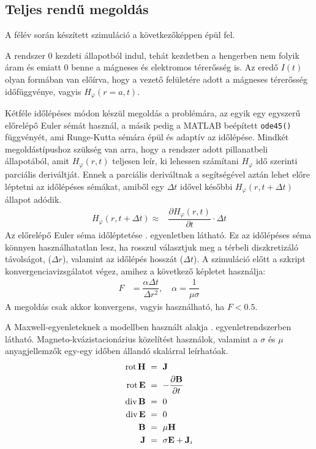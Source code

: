         \subsection{Teljes rendű megoldás}
            A félév során készített szimuláció a következőképpen épül fel.
            \par
            A rendszer 0 kezdeti állapotból indul, tehát kezdetben a hengerben nem folyik áram és emiatt 0 benne a mágneses és elektromos térerősség is. Az eredő $I(t)$ olyan formában van előírva, hogy a vezető felületére adott a mágneses térerősség időfüggvénye, vagyis $H_{\varphi}(r=a,t)$.
            \par
            Kétféle időlépéses módon készül megoldás a problémára, az egyik egy egyszerű előrelépő Euler sémát használ, a másik pedig a MATLAB beépített \verb|ode45()| függvényét, ami Runge-Kutta sémára épül és adaptív az időlépése. Mindkét megoldástípushoz szükség van arra, hogy a rendszer adott pillanatbeli állapotából, amit $H_{\varphi}(r,t)$ teljesen leír, ki lehessen számítani $H_{\varphi}$ idő szerinti parciális deriváltját. Ennek a parciális deriváltnak a segítségével aztán lehet előre léptetni az időlépéses sémákat, amiből egy $\Delta t$ idővel későbbi $H_{\varphi}(r,t+\Delta t)$ állapot adódik.
            \begin{align}
                \label{equ:fe}
                H_{\varphi}(r,t+\Delta t) \approx & \dfrac{\partial H_{\varphi}(r,t)}{\partial t} \cdot \Delta t
            \end{align}
            Az előrelépő Euler séma időléptetése . egyenletben látható. Ez az időlépéses séma könnyen használhatatlan lesz, ha rosszul választjuk meg a térbeli diszkretizáló távolságot, ($\Delta r$), valamint az időlépés hosszát ($\Delta t$). A szimuláció előtt a szkript konvergenciavizsgálatot végez, amihez a következő képletet használja:
            \begin{align}
                F &= \dfrac{\alpha \Delta t}{\Delta r^2}, \quad \alpha = \dfrac{1}{\mu \sigma}
            \end{align}
            A megoldás csak akkor konvergens, vagyis használható, ha $F<0.5$.
            \par
            A Maxwell-egyenleteknek a modellben használt alakja . egyenletrendszerben látható. Magneto-kvázistacionárius közelítést használok, valamint a $\sigma$ és $\mu$ anyagjellemzők egy-egy időben állandó skalárral leírhatóak.
            \begin{equation}\label{equ:maxwell}
                \begin{aligned}
                \operatorname{rot} \textbf{H}~&=~{\bf J} \\
                \operatorname{rot} \textbf{E}~&=~-\dfrac{\partial \textbf{B}}{\partial t} \\
                \operatorname{div} \textbf{B}~&=~0 \\
                \operatorname{div} \textbf{E}~&=~0 \\
                \textbf{B}~&=~\mu \textbf{H} \\
                \textbf{J}~&=~\sigma\textbf{E} + \textbf{J}_i
                \end{aligned}
            \end{equation}

